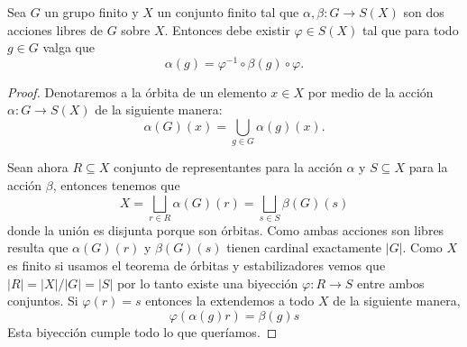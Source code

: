 \documentclass[tesis.tex]{subfiles}
\begin{document}
\begin{lema}\label{lema_acciones_finitas}
	Sea $G$ un grupo finito y $X$ un conjunto finito tal que $\alpha, \beta : G \to S(X)$ son dos acciones libres de $G$ sobre $X$. 
	Entonces debe existir $\varphi \in S(X)$ tal que para todo $g \in G$ valga que 
	\[
	\alpha (g) = \varphi^{-1} \circ \beta(g) \circ \varphi.
	\]
\end{lema}
\begin{proof}
	Denotaremos a la órbita de un elemento $x \in X$ por medio de la acción $\alpha:G \to S(X)$ de la siguiente manera:
	\[
		\alpha(G)(x) = \bigcup_{g \in G} \alpha(g) (x).
	\]
	
	Sean ahora $R \subseteq X$ conjunto de representantes para la acción $\alpha$ y $S \subseteq X$ para la acción $\beta$, entonces tenemos que
	\[
		X = \bigsqcup_{r \in R} \alpha(G) (r) = \bigsqcup_{s \in S} \beta(G) (s)
	\]
	donde la unión es disjunta porque son órbitas. 
	Como ambas acciones son libres resulta que $\alpha(G)(r)$ y $\beta(G)(s)$ tienen cardinal exactamente $|G|$.
	Como $X$ es finito si usamos el teorema de órbitas y estabilizadores vemos que $|R| = |X| / |G| = |S|$ por lo tanto existe una biyección $\varphi: R \to S$ entre ambos conjuntos.
	Si $\varphi(r) = s$ entonces la extendemos a todo $X$ de la siguiente manera,
	\[
		\varphi (\alpha(g) r) = \beta(g)  s
	\]
	Esta biyección cumple todo lo que queríamos.
	
\end{proof}
\end{document}
